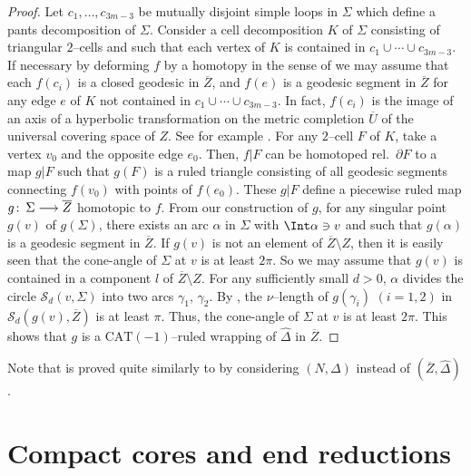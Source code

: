 \documentclass{gtart_a}
\theoremstyle{definition}
\numberwithin{equation}{section}
\begin{document}
\begin{proof}%
Let $c_1,\ldots, c_{3m-3}$ be mutually disjoint simple loops in $\Sigma$ which define a pants decomposition of 
$\Sigma$.
Consider a cell decomposition $K$ of $\Sigma$ consisting of triangular $2$--cells and such that each vertex of $K$ 
is contained in $c_1\cup\cdots\cup c_{3m-3}$.
If necessary by deforming $f$ by a homotopy in the sense of  we may assume that each $f(c_i)$ 
is a closed geodesic in $\overline Z$, and $f(e)$ is a geodesic segment in $\overline Z$ for any edge $e$ of $K$ 
not contained in $c_1\cup\cdots\cup c_{3m-3}$.
In fact, $f(c_i)$ is the image of an axis of a hyperbolic transformation on the metric completion $\overline U$ 
of the universal covering space of $Z$.
See for example \cite[Theorem 6.8\,(1)]{bh}.
For any $2$--cell $F$ of $K$, take a vertex $v_0$ and the opposite edge $e_0$.
Then, $f|F$ can be homotoped rel.\ $\partial F$ to a map $g|F$ such that $g(F)$ is a ruled triangle consisting of 
all geodesic segments connecting $f(v_0)$ with points of $f(e_0)$.
These $g|F$ define a piecewise ruled map $g\mskip0.5mu\colon\thinspace \Sigma\longrightarrow \overline Z$ homotopic to $f$.
From our construction of $g$, for any singular point $g(v)$ of $g(\Sigma)$, there exists an arc $\alpha$ in 
$\Sigma$ with $\Int \alpha\ni v$ and such that $g(\alpha)$ is a geodesic segment in $\overline Z$.
If $g(v)$ is not an element of $\overline Z\setminus Z$, then it is easily seen that the cone-angle of $\Sigma$ 
at $v$ is at least $2\pi$.
So we may assume that $g(v)$ is contained in a component $l$ of $\overline Z\setminus Z$.
For any sufficiently small $d>0$, $\alpha$ divides the circle $\mathcal{S}_d(v,\Sigma)$ into two arcs $\gamma_1$, 
$\gamma_2$.
By , the $\nu$--length of $g(\gamma_i)$ $(i=1,2)$ in $\mathcal{S}_d(g(v),\overline Z)$ is at 
least $\pi$.
Thus, the cone-angle of $\Sigma$ at $v$ is at least $2\pi$.
This shows that $g$ is a $\mathrm{CAT}(-1)$--ruled wrapping of $\hat \Delta$ in $\overline Z$.
\end{proof}


Note that  is proved quite similarly to  by considering $(N,\Delta)$ 
instead of $(\overline Z,\hat \Delta)$.




\section{Compact cores and end reductions}\label{S3}
\end{document}
